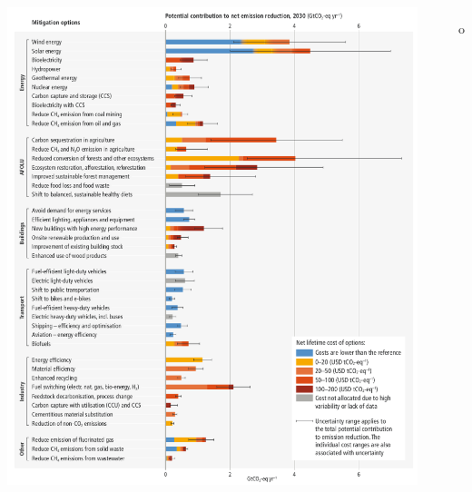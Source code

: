   
\begin{frame}
  \begin{scriptsize}

    \vspace{-0.1cm}
    \begin{columns}
      \begin{center}
          \includegraphics[width=1.0\textwidth]{plots/WG3_mitigation_options.png}
      \end{center}   

      \begin{itemize}\setlength\itemsep{1.9ex}        
        \item[o] 
      \end{itemize}
    \end{columns}

  \end{scriptsize}
  \end{frame} 

